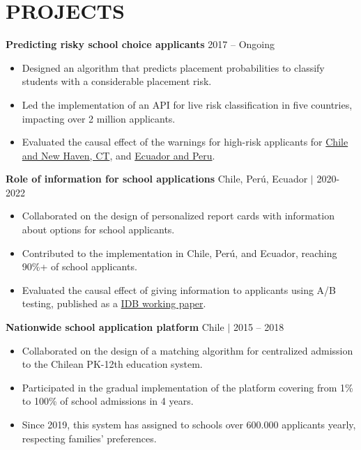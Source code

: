 \documentclass[letter,9pt]{extarticle}
\begin{document}


\section*{PROJECTS}

\noindent
\textbf{Predicting risky school choice applicants} \hfill   2017 – Ongoing 
\begin{itemize}
    \item Designed an algorithm that predicts placement probabilities to classify students with a considerable placement risk.
    \item Led the implementation of an API for live risk classification in five countries, impacting over 2 million applicants.
    \item Evaluated the causal effect of the warnings for high-risk applicants for \href{https://academic.oup.com/qje/article/137/3/1791/6544686?login=false}{Chile and New Haven, CT}, and  \href{https://publications.iadb.org/en/can-information-school-attributes-and-placement-probabilities-direct-search-and-choice-evidence}{Ecuador and Peru}.
\end{itemize}
\noindent
\textbf{Role of information for school applications} \hfill Chile, Perú, Ecuador $|$ 2020-2022
\begin{itemize}
    \item Collaborated on the design of personalized report cards with information about options for school applicants.
    \item Contributed to the implementation in Chile, Perú, and Ecuador, reaching 90\%+ of school applicants.
    \item Evaluated the causal effect of giving information to applicants using A/B testing, published as a \href{https://publications.iadb.org/en/can-information-school-attributes-and-placement-probabilities-direct-search-and-choice-evidence}{IDB working paper}.
\end{itemize}

\noindent
\textbf{Nationwide school application platform} \hfill Chile $|$ 2015 – 2018
\begin{itemize}
    \item Collaborated on the design of a matching algorithm for centralized admission to the Chilean PK-12th education system.
    \item Participated in the gradual implementation of the platform covering from 1\% to 100\% of school admissions in 4 years.
    \item Since 2019, this system has assigned to schools over 600.000 applicants yearly, respecting families' preferences.
\end{itemize}
\end{document}
